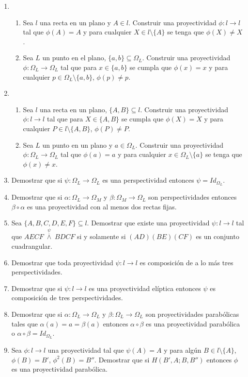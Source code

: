 \documentclass[12pt]{report}
\numberwithin{section}{chapter}
\begin{document}
\begin{enumerate}
\item 
\begin{enumerate}
\item Sea $l$ una recta en un plano y $A \in l$. Construir una proyectividad $\phi:l \to l$ tal que $\phi(A)=A$ y para cualquier $X \in l\setminus\{A\}$ se tenga que $\phi(X) \neq X$.
\item Sea $L$ un punto en el plano, $\{a,b\} \subseteq \Omega_L$. Construir una proyectividad $\phi:\Omega_L \to \Omega_L$ tal que para $x \in \{a,b\}$ se cumpla que $\phi(x)=x$ y para cualquier $p \in \Omega_L \setminus\{a,b\}$, $\phi(p) \neq p$.
\end{enumerate}

\item 
\begin{enumerate}
\item Sea $l$ una recta en un plano, $\{A,B\} \subseteq l$. Construir una proyectividad $\phi:l \to l$ tal que para $X \in \{A,B\}$ se cumpla que $\phi(X)=X$ y para cualquier $P \in l \setminus\{A,B\}$, $\phi(P) \neq P$.
\item Sea $L$ un punto en un plano y $a \in \Omega_L$. Construir una proyectividad $\phi:\Omega_L\to \Omega_L$ tal que $\phi(a)=a$ y para cualquier $x \in \Omega_L\setminus\{a\}$ se tenga que $\phi(x) \neq x$.
\end{enumerate}

\item Demostrar que si $\psi: \Omega_L \to \Omega_L$ es una perspectividad entonces $\psi= Id_{\Omega_L}$. 

\item Demostrar que si $\alpha: \Omega_L \to \Omega_M$ y $\beta: \Omega_M \to \Omega_L$ son perspectividades entonces $\beta \circ \alpha$ es una proyectividad con al menos dos rectas fijas.

\item Sea $\{A,B,C,D,E,F\} \subseteq l$. Demostrar que existe una proyectividad $\psi:l \to l$ tal que \linebreak $AECF\;\overset{\psi}{\overline{\wedge}}\; BDCF$ si y solamente si $(AD)(BE)(CF)$ es un conjunto cuadrangular.

\item Demostrar que toda proyectividad $\psi:l \to l$ es composición de a lo más tres perspectividades.

\item Demostrar que si $\psi:l \to l$ es una proyectividad elíptica entonces $\psi$ es composición de tres perspectividades.

\item Demostrar que si $\alpha: \Omega_L \to \Omega_L$ y $\beta:\Omega_L \to \Omega_L$ son  proyectividades parabólicas tales que $\alpha(a)=a=\beta(a)$ entonces $\alpha \circ \beta$ es una proyectividad parabólica o $\alpha \circ \beta = Id_{\Omega_L}$.

\item Sea $\phi:l \to l$ una proyectividad tal que $\psi(A)=A$ y para algún $B \in l\setminus\{A\}$, $\phi(B)=B'$, $\phi^2(B)=B''$. Demostrar que si $H(B',A;B,B'')$ entonces $\phi$ es una proyectividad parabólica.

\end{enumerate}
\end{document}
